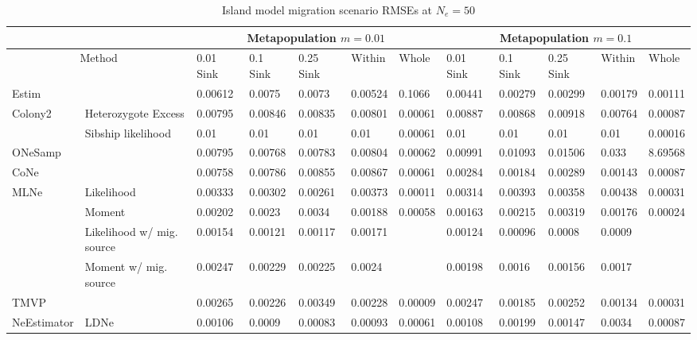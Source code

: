 \begin{table}[h]
\centering \small
\caption[Island model migration scenario RMSEs at $N_e = 50$]{Island model migration scenario RMSEs at $N_e = 50$}
\label{tab:ne2}
\begin{tabular}{ | p{} | p{} | p{} | p{} | p{} | p{} | p{} | p{} | p{} | p{} | p{} | p{} | }
\hline
\multicolumn{2}{c}{ }   & \multicolumn{5}{c}{Metapopulation $m = 0.01$}  & \multicolumn{5}{c}{Metapopulation $m = 0.1$}  \\ \hline
\multicolumn{2}{c}{Method} & 0.01 Sink & 0.1 Sink & 0.25 Sink & Within & Whole & 0.01 Sink & 0.1 Sink & 0.25 Sink & Within & Whole	\\ \hline
Estim 	&   & 0.00612 & 0.0075 & 0.0073 & 0.00524 & 0.1066 & 0.00441 & 0.00279 & 0.00299 & 0.00179 & 0.00111	\\ \hline
Colony2 	& Heterozygote Excess & 0.00795 & 0.00846 & 0.00835 & 0.00801 & 0.00061 & 0.00887 & 0.00868 & 0.00918 & 0.00764 & 0.00087	\\ \hline
 		& Sibship likelihood & 0.01 & 0.01 & 0.01 & 0.01 & 0.00061 & 0.01 & 0.01 & 0.01 & 0.01 & 0.00016	\\ \hline
ONeSamp &  & 0.00795 & 0.00768 & 0.00783 & 0.00804 & 0.00062 & 0.00991 & 0.01093 & 0.01506 & 0.033 & 8.69568	\\ \hline
CoNe 	&   & 0.00758 & 0.00786 & 0.00855 & 0.00867 & 0.00061 & 0.00284 & 0.00184 & 0.00289 & 0.00143 & 0.00087	\\ \hline
MLNe 	& Likelihood & 0.00333 & 0.00302 & 0.00261 & 0.00373 & 0.00011 & 0.00314 & 0.00393 & 0.00358 & 0.00438 & 0.00031	\\ \hline
 		& Moment & 0.00202 & 0.0023 & 0.0034 & 0.00188 & 0.00058 & 0.00163 & 0.00215 & 0.00319 & 0.00176 & 0.00024	\\ \hline
 		& Likelihood w/ mig. source & 0.00154 & 0.00121 & 0.00117 & 0.00171 &  & 0.00124 & 0.00096 & 0.0008 & 0.0009 & 	\\ \hline
 		& Moment w/ mig. source & 0.00247 & 0.00229 & 0.00225 & 0.0024 &  & 0.00198 & 0.0016 & 0.00156 & 0.0017 & 	\\ \hline
TMVP 	&   & 0.00265 & 0.00226 & 0.00349 & 0.00228 & 0.00009 & 0.00247 & 0.00185 & 0.00252 & 0.00134 & 0.00031	\\ \hline
NeEstimator & LDNe & 0.00106 & 0.0009 & 0.00083 & 0.00093 & 0.00061 & 0.00108 & 0.00199 & 0.00147 & 0.0034 & 0.00087	\\ \hline

\end{tabular}
\end{table}
